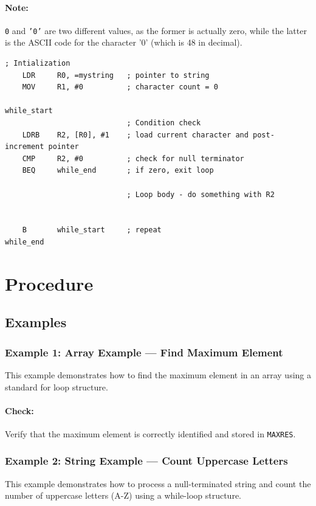 \paragraph{Note:} \texttt{0} and \texttt{'0'} are two different values, as the former is actually zero, while the latter is the ASCII code for the character '0' (which is 48 in decimal).
\newpage

\begin{lstlisting}[caption={While loop with string processing example}]
    ; Intialization
    LDR     R0, =mystring   ; pointer to string
    MOV     R1, #0          ; character count = 0

while_start
                            ; Condition check
    LDRB    R2, [R0], #1    ; load current character and post-increment pointer
    CMP     R2, #0          ; check for null terminator
    BEQ     while_end       ; if zero, exit loop
    
                            ; Loop body - do something with R2

    
    B       while_start     ; repeat
while_end
\end{lstlisting}

\newpage
\section{Procedure}

\subsection{Examples}

\subsubsection{Example 1: Array Example — Find Maximum Element}
This example demonstrates how to find the maximum element in an array using a standard for loop structure.

\paragraph{Check:} Verify that the maximum element is correctly identified and stored in \texttt{MAXRES}.
\newpage

\subsubsection{Example 2: String Example — Count Uppercase Letters}
This example demonstrates how to process a null-terminated string and count the number of uppercase letters (A-Z) using a while-loop structure.

